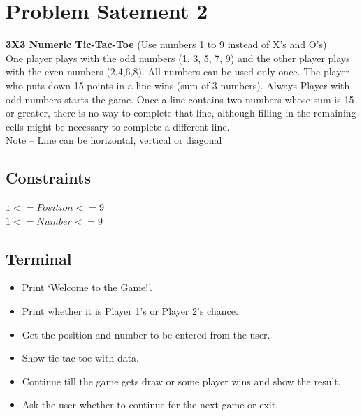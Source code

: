 \documentclass{article}
\begin{document}
    \section{Problem Satement 2}
    \textbf{3X3 Numeric Tic-Tac-Toe} (Use numbers 1 to 9 instead of X’s and O’s)
    \\One player plays with the odd numbers (1, 3, 5, 7, 9) and the other player plays with the even numbers (2,4,6,8). All numbers can be used only once. The player who puts down 15 points in a line wins (sum of 3 numbers). Always Player with odd numbers starts the game. Once a line contains two numbers whose sum is 15 or greater, there is no way to complete that line, although filling in the remaining cells might be necessary to complete a different line.
    \\Note – Line can be horizontal, vertical or diagonal\\

    \subsection{Constraints}
    $1<=Position<=9$
    \\$1<=Number<=9$
 
    \subsection{Terminal}
    \begin{itemize}
        \item Print ‘Welcome to the Game!’.	
        \item Print whether it is Player 1’s or Player 2’s chance.
        \item Get the position and number to be entered from the user.
        \item Show tic tac toe with data.
        \item Continue till the game gets draw or some player wins and show the result.
        \item Ask the user whether to continue for the next game or exit.
    \end{itemize}
\end{document}

